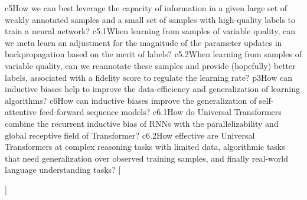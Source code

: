 {{    %
    {c5}{How we can best leverage the capacity of information in a given large set of weakly annotated samples and a small set of samples with high-quality labels to train a neural network?}%
    {c5.1}{When learning from samples of variable quality, can we meta learn an adjustment for the magnitude of the parameter updates in backpropagation based on the merit of labels?}
    {c5.2}{When learning from samples of variable quality, can we reannotate these samples and provide (hopefully) better labels, associated with a fidelity score to regulate the learning rate?}
    {p3}{How can inductive biases help to improve the data-efficiency and generalization of learning algorithms?}
    {c6}{How can inductive biases improve the generalization of self-attentive feed-forward sequence models?}
    {c6.1}{How do Universal Transformers combine the recurrent inductive bias of RNNs with the parallelizability and global receptive field of Transformer?}
    {c6.2}{How effective are Universal Transformers at complex reasoning tasks with limited data, algorithmic tasks that need generalization over observed training samples, and finally real-world language understanding tasks?}
    }[\PackageError{rq}{Undefined option to rq: #1}{}]%
}%

\newcommand{\resqname}[1]{%
    \IfEqCase{#1}{%
    {main}{RQ-Main}
    {p1}{RQ-1}
    {c2}{RQ-1.1}
    {c2.1}{RQ-1.1.1}
    {c2.2}{RQ-1.1.2}
    {c2.3}{RQ-1.1.3}
    {c3}{RQ-1.2}
    {c3.1}{RQ-1.2.1}
    {c3.2}{RQ-1.2.2}
    {c3.3}{RQ-1.2.3}
    {p2}{RQ-2}
    {c4}{RQ-2.1}%
    {c4.1}{RQ-2.1.1}
    {c4.2}{RQ-2.1.2}
    {c4.3}{RQ-2.1.3}
    {c5}{RQ-2.2}%
    {c5.1}{RQ-2.2.1}
    {c5.2}{RQ-2.2.2}
    {p3}{RQ-3}
    {c6}{RQ-3.1}%
    {c6.1}{RQ-3.1.1}
    {c6.2}{RQ-3.1.2}
    }[\PackageError{rq}{Undefined option to rq: #1}{}]%
}%

\newcommand{\resq}[1]{%
    \begin{resqbox}
        \begin{enumerate}
            \item[\textbf{\resqname{#1}}] \emph{\resqcontent{#1}}
        \end{enumerate}
    \end{resqbox}
}%